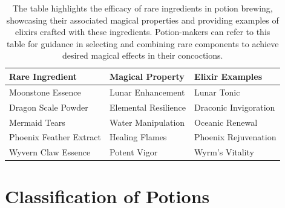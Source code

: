 \begin{table}
\begin{center}
\begin{tabular}{ l l l }
\hline
\textbf{Rare Ingredient} & \textbf{Magical Property} & \textbf{Elixir Examples} \\
\hline
Moonstone Essence & Lunar Enhancement & Lunar Tonic \\
Dragon Scale Powder & Elemental Resilience & Draconic Invigoration \\
Mermaid Tears & Water Manipulation & Oceanic Renewal \\
Phoenix Feather Extract & Healing Flames & Phoenix Rejuvenation \\
Wyvern Claw Essence & Potent Vigor & Wyrm's Vitality \\
\hline
\end{tabular}
\caption{\label{tbl:potions}The table highlights the efficacy of rare ingredients in potion brewing, showcasing their associated magical properties and providing examples of elixirs crafted with these ingredients. Potion-makers can refer to this table for guidance in selecting and combining rare components to achieve desired magical effects in their concoctions.}
\end{center}
\end{table}

\section{Classification of Potions}

